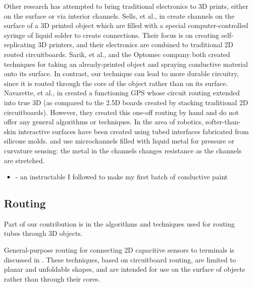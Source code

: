 Other research has attempted to bring traditional electronics to 3D prints, either on the surface or via interior channels.  Sells, et al., in \cite{Sells-reprap} create channels on the surface of a 3D printed object which are filled with a special computer-controlled syringe of liquid solder to create connections.  Their focus is on creating self-replicating 3D printers, and their electronics are combined to traditional 2D routed circuitboards.  Sarik, et al., \cite{Sarik-tracebrush}  and the Optomec company \cite{optomec} both created techniques for taking an already-printed object and spraying conductive material onto its surface.  In contrast, our technique can lead to more durable circuitry, since it is routed through the core of the object rather than on its surface.  Navarette, et al., in \cite{Navarrette-gps} created a functioning GPS whose circuit routing extended into true 3D (as compared to the 2.5D boards created by stacking traditional 2D circuitboards).  However, they created this one-off routing by hand and do not offer any general algorithms or techniques.  In the area of robotics, softer-than-skin interactive surfaces have been created using tubed interfaces fabricated from silicone molds.  \cite{Park-microchannels} and \cite{Majidi-curvature} use microchannels filled with liquid metal for pressure or curvature sensing: the metal in the channels changes resistance as the channels are stretched.
\begin{itemize}
\item \cite{icecats-conductivepaint} - an instructable I followed to make my first batch of conductive paint
\end{itemize}

\subsection{Routing}

Part of our contribution is in the algorithms and techniques used for routing tubes through 3D objects.

General-purpose routing for connecting 2D capacitive sensors to terminals is discussed in \cite{Savage-midas}.  These techniques, based on circuitboard routing, are limited to planar and unfoldable shapes, and are intended for use on the surface of objects rather than through their cores.

